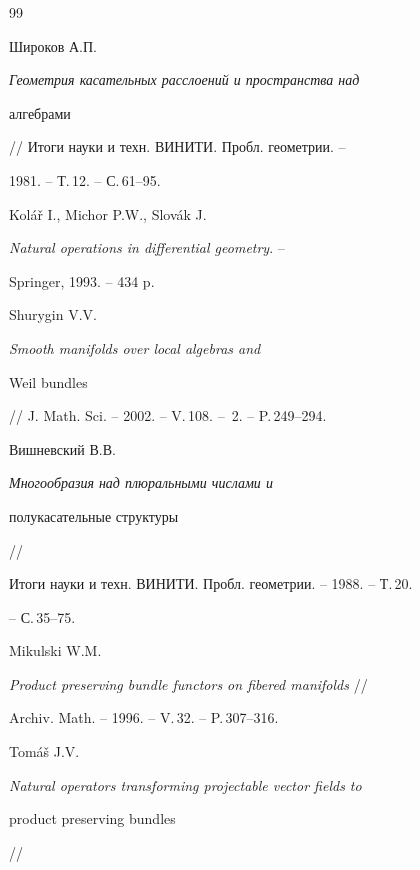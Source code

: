 \begin{thebibliography}{99}







Широков А.П.


{\it Геометрия касательных расслоений и пространства над


алгебрами} // Итоги науки и техн. ВИНИТИ. Пробл. геометрии. --


1981. -- Т.\,12. -- С.\,61--95.







Kol\'a\v r I., Michor P.W., Slov\'ak J.


{\it Natural operations in differential geometry}. --


Springer, 1993. -- 434 p.







Shurygin V.V. {\it Smooth manifolds over local algebras and


Weil bundles} // J. Math. Sci. -- 2002. -- V.\,108. -- \No\,2. -- P.\,249--294.







Вишневский В.В.


{\it Многообразия над плюральными числами и


полукасательные структуры} //


 Итоги науки и техн. ВИНИТИ. Пробл. геометрии. -- 1988. -- Т.\,20.


-- С.\,35--75.







Mikulski W.M.


{\it Product preserving bundle functors on fibered manifolds} //


Archiv. Math. -- 1996. -- V.\,32. -- P.\,307--316.







Tom\'a\v s J.V.


{\it Natural operators transforming projectable vector fields to


product preserving bundles} //



\end{thebibliography}
